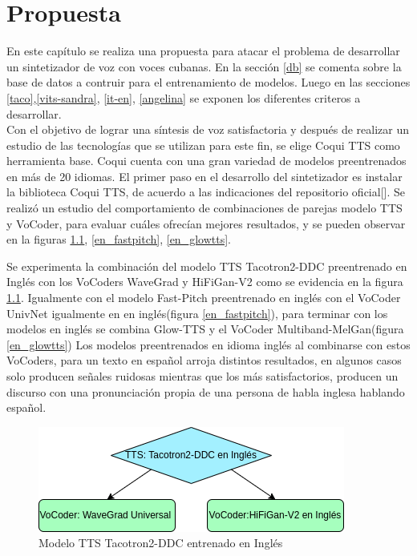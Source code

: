 \chapter{Propuesta}\label{chapter:proposal}
En este capítulo se realiza una propuesta para atacar el problema de desarrollar un sintetizador de voz con voces cubanas. En la sección \ref{db} se comenta sobre la base de datos a contruir para el entrenamiento de modelos. Luego en las secciones \ref{taco},\ref{vits-sandra}, \ref{it-en}, \ref{angelina} se exponen los diferentes criteros a desarrollar.\\

Con el objetivo de lograr una síntesis de voz satisfactoria y después de realizar un estudio de las tecnologías que se utilizan para este fin, se elige Coqui TTS como herramienta base. Coqui cuenta con una gran variedad de modelos preentrenados en más de 20 idiomas.  
El primer paso en el desarrollo del sintetizador es instalar la biblioteca Coqui TTS, de acuerdo a las indicaciones del repositorio oficial[\cite{coqui-doc}]. Se realizó un estudio del comportamiento de combinaciones de parejas modelo TTS y VoCoder, para evaluar cuáles ofrecían mejores resultados, y se pueden observar en la figuras \ref{en_tacotron2}, \ref{en_fastpitch}, \ref{en_glowtts}.

Se experimenta la combinación del modelo TTS Tacotron2-DDC preentrenado en Inglés con los VoCoders WaveGrad y HiFiGan-V2 como se evidencia en la figura \ref{en_tacotron2}. Igualmente con el modelo Fast-Pitch preentrenado en inglés con el VoCoder UnivNet igualmente en  en inglés(figura \ref{en_fastpitch}), para terminar con los modelos en inglés se combina Glow-TTS y el VoCoder Multiband-MelGan(figura \ref{en_glowtts})
Los modelos preentrenados en idioma inglés al combinarse con estos VoCoders, para un texto en español arroja distintos resultados, en algunos casos solo producen señales ruidosas mientras que los más satisfactorios, producen un discurso con una pronunciación propia de una persona de habla inglesa hablando español.

\begin{figure}[H]
	\centering
	\includegraphics[width=0.6\linewidth]{Graphics/en_tacotron2}
	\caption{Modelo TTS Tacotron2-DDC entrenado en Inglés}
	\label{en_tacotron2}
\end{figure}

